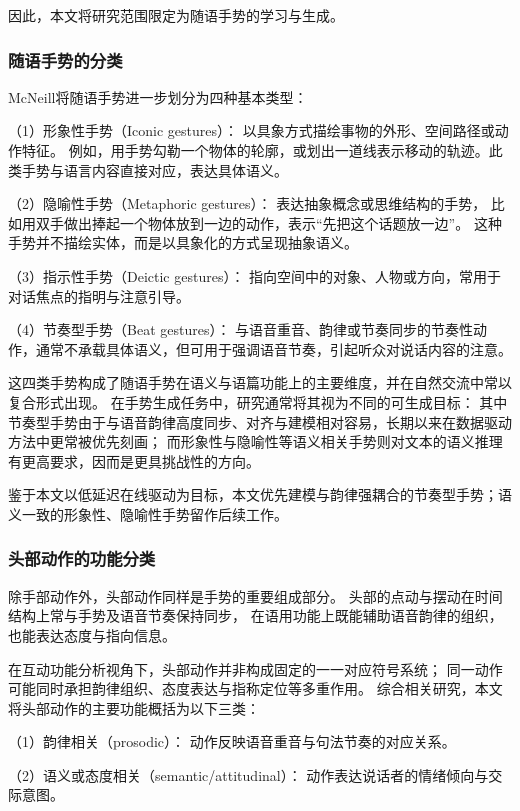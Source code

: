 因此，本文将研究范围限定为随语手势的学习与生成。

\subsubsection{随语手势的分类}
McNeill\cite{mcneill_1992_hand}将随语手势进一步划分为四种基本类型：%

（1）形象性手势（Iconic gestures）：
以具象方式描绘事物的外形、空间路径或动作特征。
例如，用手势勾勒一个物体的轮廓，或划出一道线表示移动的轨迹。此类手势与语言内容直接对应，表达具体语义。

（2）隐喻性手势（Metaphoric gestures）：
表达抽象概念或思维结构的手势，%
比如用双手做出捧起一个物体放到一边的动作，表示“先把这个话题放一边”。%
这种手势并不描绘实体，而是以具象化的方式呈现抽象语义。

（3）指示性手势（Deictic gestures）：
指向空间中的对象、人物或方向，常用于对话焦点的指明与注意引导。

（4）节奏型手势（Beat gestures）：
与语音重音、韵律或节奏同步的节奏性动作，通常不承载具体语义，但可用于强调语音节奏，引起听众对说话内容的注意。

这四类手势构成了随语手势在语义与语篇功能上的主要维度，并在自然交流中常以复合形式出现。%
在手势生成任务中，研究通常将其视为不同的可生成目标：
其中节奏型手势由于与语音韵律高度同步、对齐与建模相对容易，长期以来在数据驱动方法中更常被优先刻画；%
而形象性与隐喻性等语义相关手势则对文本的语义推理有更高要求，因而是更具挑战性的方向。%

鉴于本文以低延迟在线驱动为目标，本文优先建模与韵律强耦合的节奏型手势；语义一致的形象性、隐喻性手势留作后续工作。

\subsubsection{头部动作的功能分类}
除手部动作外，头部动作同样是手势的重要组成部分。%
头部的点动与摆动在时间结构上常与手势及语音节奏保持同步\cite{gesture_and_speech_in_interaction}，%
在语用功能上既能辅助语音韵律的组织，也能表达态度与指向信息。%

在互动功能分析视角下，头部动作并非构成固定的一一对应符号系统；%
同一动作可能同时承担韵律组织、态度表达与指称定位等多重作用\cite{MCCLAVE2000855}。%
综合相关研究\cite{MCCLAVE2000855, gesture_and_speech_in_interaction}，本文将头部动作的主要功能概括为以下三类：%

（1）韵律相关（prosodic）：
动作反映语音重音与句法节奏的对应关系。%
 
（2）语义或态度相关（semantic/attitudinal）：
动作表达说话者的情绪倾向与交际意图。%

